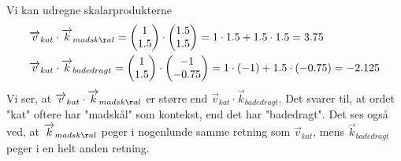 \documentclass{article}
\begin{document}
Vi kan udregne skalarprodukterne
\begin{align*}
&\overrightarrow{v}_{kat}\cdot \overrightarrow{k}_{madsk\aa l} = \begin{pmatrix} 1\\ 1.5\end{pmatrix}  \cdot  \begin{pmatrix} 1.5\\ 1.5\end{pmatrix} = 1\cdot 1.5 +  1.5\cdot 1.5 = 3.75 \\ 
&\overrightarrow{v}_{kat}\cdot \overrightarrow{k}_{badedragt} = \begin{pmatrix} 1\\ 1.5\end{pmatrix}  \cdot  \begin{pmatrix} -1\\ -0.75\end{pmatrix} = 1\cdot (-1) +  1.5\cdot (-0.75) = -2.125 
\end{align*}
Vi ser, at $\overrightarrow{v}_{kat}\cdot \overrightarrow{k}_{madsk\aa l}$ er større end $\overrightarrow{v}_{kat}\cdot \overrightarrow{k}_{badedragt}$. Det svarer til, at ordet "kat" oftere har "madskål" som kontekst, end det har "badedragt". Det ses også ved, at  $\overrightarrow{k}_{madsk\aa l}$ peger i nogenlunde samme retning som $\overrightarrow{v}_{kat}$, mens $\overrightarrow{k}_{badedragt} $ peger i en helt anden retning.
\end{document}
